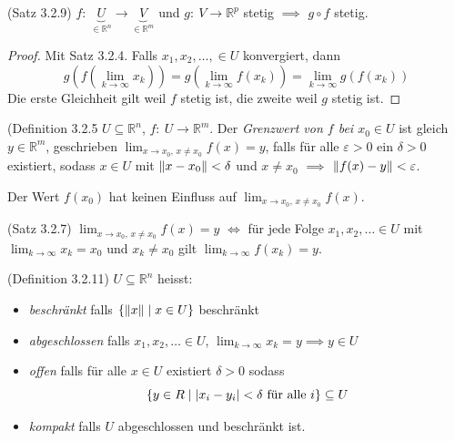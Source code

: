 \documentclass[a4paper,10pt]{article}
\def\R{\mathbb{R}}
\DeclarePairedDelimiter\abs{\lvert}{\rvert}
\DeclarePairedDelimiter\norm{\lVert}{\rVert}
\begin{document}
\begin{subbox}{(Satz 3.2.9)}
    \( f: \: \underbrace{U}_{\in \R^n} \to \underbrace{V}_{\in \R^m} \) und \( g: \: V \to \R^p \) stetig \( \implies \) \(g \circ f \) stetig.
\end{subbox}

\begin{proof}
    Mit Satz 3.2.4. Falls \( x_1, x_2, \dots, \in U \) konvergiert, dann
    \[ g(f(\lim_{k \to \infty} x_k)) = g(\lim_{k \to \infty} f(x_k)) = \lim_{k \to \infty} g(f(x_k)) \]
    Die erste Gleichheit gilt weil \( f \) stetig ist, die zweite weil \( g \) stetig ist.
\end{proof}

\begin{subbox}{(Definition 3.2.5}
    \( U \subseteq \R^n \), \(f: \: U \to \R^m \). Der \emph{Grenzwert von \( f \) bei \( x_0 \in U \)} ist gleich \( y \in \R^m \), geschrieben \( \lim_{x \to x_0, \, x \neq x_0} f(x) = y \), falls für alle \( \varepsilon > 0 \) ein \( \delta > 0 \) existiert, sodass \( x \in U \) mit \( \norm{x - x_0} < \delta \) und \( x \neq x_0 \) \( \implies \) \( \norm{f(x) - y} < \varepsilon \).
\end{subbox}

Der Wert \( f(x_0) \) hat keinen Einfluss auf \( \lim_{x \to x_0, \, x \neq x_0} f(x) \).

\begin{subbox}{(Satz 3.2.7)}
    \( \lim_{x \to x_0, \, x \neq x_0} f(x) = y \) \( \iff \) für jede Folge \( x_1, x_2, \dots \in U \) mit \( \lim_{k \to \infty} x_k = x_0 \) und \( x_k \neq x_0 \) gilt \( \lim_{k \to \infty} f(x_k) = y \).
\end{subbox}

\begin{mainbox}{(Definition 3.2.11)}
    \( U \subseteq \R^n \) heisst:
    \begin{itemize}
        \item \emph{beschränkt} falls \( \{ \norm{x} \; | \; x \in U \} \) beschränkt
        \item \emph{abgeschlossen} falls \( x_1, x_2, \dots \in U \), \( \lim_{k \to \infty} x_k = y \implies y \in U \)
        \item \emph{offen} falls für alle \( x \in U \) existiert \( \delta > 0 \) sodass \[ \{ y \in R \; | \; \abs{x_i - y_i} < \delta \text{ für alle } i \} \subseteq U \]
        \item \emph{kompakt} falls \( U \) abgeschlossen und beschränkt ist.
    \end{itemize}
\end{mainbox}
\end{document}
